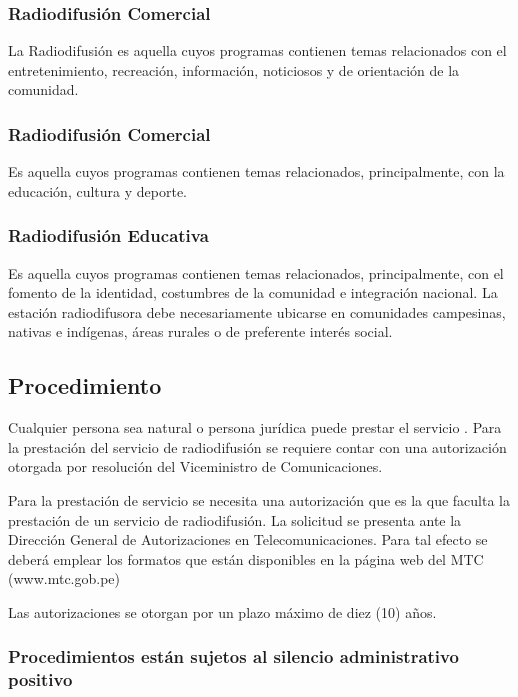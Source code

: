 \documentclass[a4paper]{IEEEtran} %
\begin{document}
\subsubsection{Radiodifusión Comercial}
La Radiodifusión es aquella cuyos programas contienen temas 
relacionados  con  el  entretenimiento,  recreación, 
información,  noticiosos  y  de  orientación  de  la 
comunidad.

\subsubsection{Radiodifusión Comercial}
Es aquella cuyos programas contienen temas 
relacionados,  principalmente,  con  la  educación, 
cultura y deporte. 

\subsubsection{Radiodifusión Educativa}

Es aquella cuyos programas contienen temas 
relacionados, principalmente, con el fomento de 
la identidad, costumbres de la comunidad e 
integración nacional. La estación radiodifusora  debe necesariamente 
ubicarse  en  comunidades  campesinas,  nativas  e 
indígenas,  áreas  rurales  o  de  preferente  interés 
social. 

\subsection{Procedimiento}

Cualquier persona sea natural o persona jurídica puede prestar el servicio . Para la prestación del servicio de radiodifusión se 
requiere  contar  con  una  autorización  otorgada 
por resolución del Viceministro de 
Comunicaciones.

Para la prestación de servicio se necesita una autorización que es la que faculta la prestación de un servicio de radiodifusión. La solicitud se presenta 
ante  la  Dirección  General  de  Autorizaciones  en 
Telecomunicaciones.  Para  tal  efecto  se  deberá 
emplear los formatos que están disponibles en la 
página web del MTC (www.mtc.gob.pe)

Las autorizaciones se otorgan por un plazo 
máximo de diez (10) años. 

\subsubsection{Procedimientos están sujetos al silencio  administrativo positivo}
\end{document}
